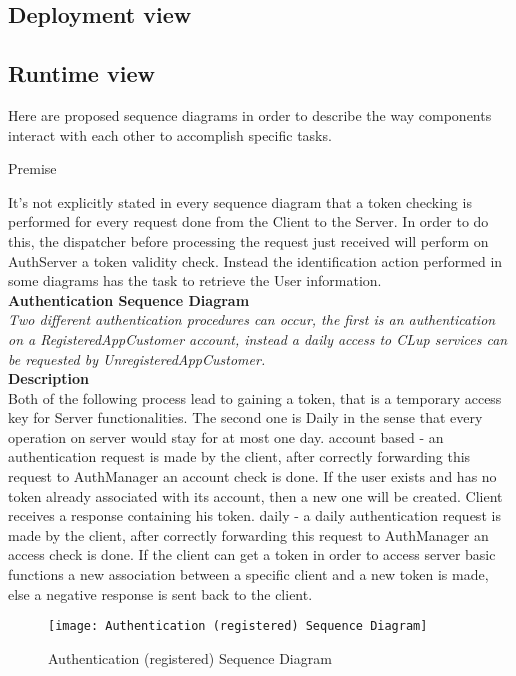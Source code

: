 \subsection{Deployment view}

\subsection{Runtime view}
Here are proposed sequence diagrams in order to describe the way components interact with each other to accomplish specific tasks.\\

\begin{center} 
Premise\\
\end{center}
It’s not explicitly stated in every sequence diagram that a token checking is performed for every request done from the Client to the Server. In order to do this, the dispatcher before processing the request just received will perform on AuthServer a token validity check. Instead the identification action performed in some diagrams has the task to retrieve the User information.\\

\newpage
\textbf{Authentication Sequence Diagram\\}
\textit{Two different authentication procedures can occur, the first is an authentication on a RegisteredAppCustomer account, instead a daily access to CLup services can be requested by UnregisteredAppCustomer.\\}
\textbf{Description\\}
Both of the following process lead to gaining a token, that is a temporary access key for Server functionalities. The second one is Daily in the sense that every operation on server would stay for at most one day.
account based - an authentication request is made by the client, after correctly forwarding this request to AuthManager an account check is done. If the user exists and has no token already associated with its account, then a new one will be created. Client receives a response containing his token. 
daily - a daily authentication request is made by the client, after correctly forwarding this request to AuthManager an access check is done. If the client can get a token in order to access server basic functions a new association between a specific client and a new token is made, else a negative response is sent back to the client. \\

\begin{figure}[H]
 \centering
 \texttt{[image: Authentication (registered) Sequence Diagram]}
 \caption{ Authentication (registered) Sequence Diagram}
 \end{figure}

